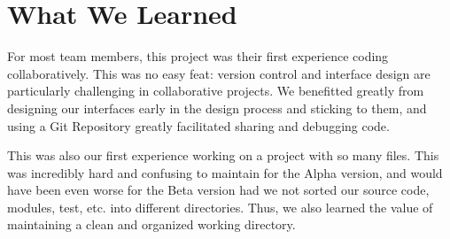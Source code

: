 \documentclass[11pt]{article}
\begin{document}



\section{What We Learned}
For most team members, this project was their first experience coding
collaboratively. This was no easy feat: version control and interface
design are particularly challenging in collaborative projects. We
benefitted greatly from designing our interfaces early in the design
process and sticking to them, and using a Git Repository greatly
facilitated sharing and debugging code.

This was also our first experience working on a project with so many
files. This was incredibly hard and confusing to maintain for the
Alpha version, and would have been even worse for the Beta version had
we not sorted our source code, modules, test, etc. into different
directories. Thus, we also learned the value of maintaining a clean
and organized working directory.
\end{document}
